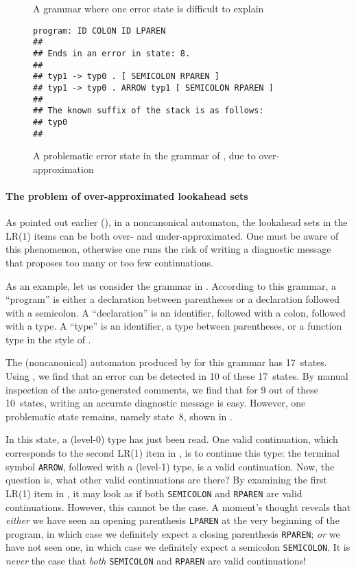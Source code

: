 \documentclass[onecolumn,11pt,nocopyrightspace,preprint]{sigplanconf}
\begin{document}
\begin{figure}

\caption{A grammar where one error state is difficult to explain}
\label{fig:declarations}
\end{figure}

\begin{figure}
\begin{verbatim}
program: ID COLON ID LPAREN
##
## Ends in an error in state: 8.
##
## typ1 -> typ0 . [ SEMICOLON RPAREN ]
## typ1 -> typ0 . ARROW typ1 [ SEMICOLON RPAREN ]
##
## The known suffix of the stack is as follows:
## typ0
##
\end{verbatim}
\caption{A problematic error state in the grammar of , due to over-approximation}
\label{fig:declarations:over}
\end{figure}

\paragraph{The problem of over-approximated lookahead sets}

As pointed out earlier (), in a noncanonical
automaton, the lookahead sets in the LR(1) items can be both over- and
under-approximated. One must be aware of this phenomenon, otherwise one runs
the risk of writing a diagnostic message that proposes too many or too few
continuations.

As an example, let us consider the grammar in .
According to this grammar, a ``program'' is either a declaration between
parentheses or a declaration followed with a semicolon. A ``declaration'' is
an identifier, followed with a colon, followed with a type. A ``type'' is an
identifier, a type between parentheses, or a function type in the style of
\ocaml.

The (noncanonical) automaton produced by \menhir for this grammar has 17~states.
Using \olisterrors, we find that an error can be detected in 10 of these
17~states. By manual inspection of the auto-generated comments, we find that
for 9 out of these 10~states, writing an accurate diagnostic message is easy. However,
one problematic state remains, namely state~8,
shown in .

In this state, a (level-0) type has just been read. One valid continuation,
which corresponds to the second LR(1) item in ,
is to continue this type: the terminal symbol \verb+ARROW+, followed with a
(level-1) type, is a valid continuation. Now, the question is, what other
valid continuations are there? By examining the first LR(1) item
in , it may look as if both \verb+SEMICOLON+
and \verb+RPAREN+ are valid continuations. However, this cannot be the case. A
moment's thought reveals that \emph{either} we have seen an opening
parenthesis \verb+LPAREN+ at the very beginning of the program, in which case
we definitely expect a closing parenthesis \verb+RPAREN+; \emph{or} we have
not seen one, in which case we definitely expect a semicolon \verb+SEMICOLON+.
It is \emph{never} the case that \emph{both} \verb+SEMICOLON+
and \verb+RPAREN+ are valid continuations!
\end{document}
